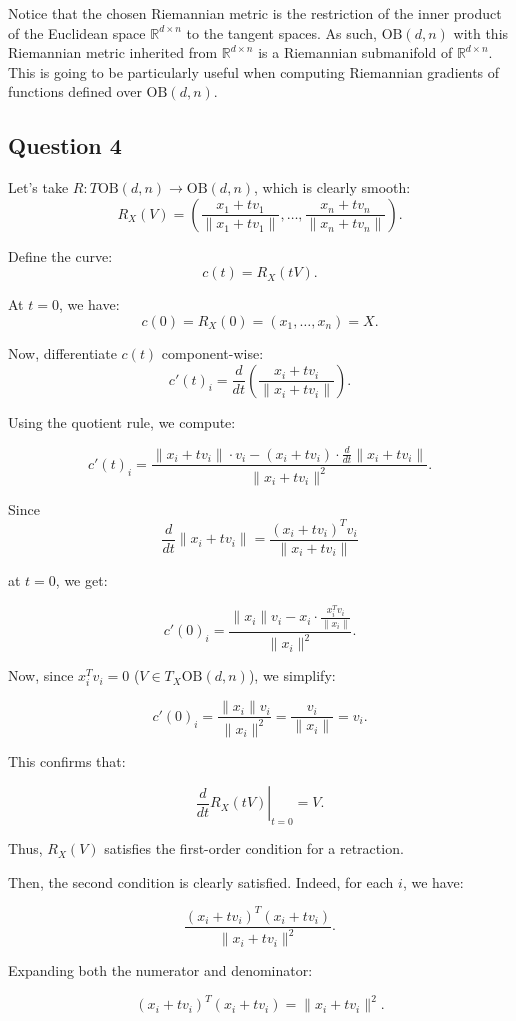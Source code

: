 \documentclass{article}
\begin{document}
Notice that the chosen Riemannian metric is the restriction of the inner product of the Euclidean space $\mathbb{R}^{d\times n}$ to the tangent spaces. As such, $\text{OB}(d, n)$ with this Riemannian metric inherited from $\mathbb{R}^{d\times n}$ is a Riemannian submanifold of $\mathbb{R}^{d\times n}$. This is going to be particularly useful when computing Riemannian gradients of functions defined over $\text{OB}(d, n)$.

\subsection*{Question 4}
Let's take $R:T\text{OB}(d, n)\rightarrow \text{OB}(d, n)$, which is clearly smooth:
\[
R_X(V)= \left(\frac{x_1 + tv_1}{\|x_1 + tv_1\|}, \dots, \frac{x_n + tv_n}{\|x_n + tv_n\|} \right).
\]

Define the curve:
\[
c(t) = R_X(tV).
\]

At \( t = 0 \), we have:
\[
c(0) = R_X(0) = (x_1, \dots, x_n)=X.
\]

Now, differentiate \( c(t) \) component-wise:
\[
c'(t)_i = \frac{d}{dt} \left( \frac{x_i + tv_i}{\|x_i + tv_i\|} \right).
\]

Using the quotient rule, we compute:

\[
c'(t)_i = \frac{\|x_i + tv_i\| \cdot v_i - (x_i + tv_i) \cdot \frac{d}{dt} \|x_i + tv_i\|}{\|x_i + tv_i\|^2}.
\]

Since
\[
\frac{d}{dt} \|x_i + tv_i\| = \frac{(x_i + tv_i)^T v_i}{\|x_i + tv_i\|}
\]

at \( t = 0 \), we get:

\[
c'(0)_i = \frac{\|x_i\| v_i - x_i \cdot \frac{x_i^T v_i}{\|x_i\|}}{\|x_i\|^2}.
\]

Now, since \( x_i^T v_i = 0 \) ($V\in T_X\text{OB}(d, n)$), we simplify:

\[
c'(0)_i = \frac{\|x_i\| v_i}{\|x_i\|^2} = \frac{v_i}{\|x_i\|}=v_i.
\]

This confirms that:

\[
\left. \frac{d}{dt} R_X(tV) \right|_{t=0} = V.
\]

Thus, \( R_X(V) \) satisfies the first-order condition for a retraction.

Then, the second condition is clearly satisfied. Indeed, for each \( i \), we have:

\[
\frac{(x_i + tv_i)^T (x_i + tv_i)}{\|x_i + tv_i\|^2}.
\]

Expanding both the numerator and denominator:

\[
(x_i + tv_i)^T (x_i + tv_i) = \|x_i + tv_i\|^2.
\]
\end{document}
